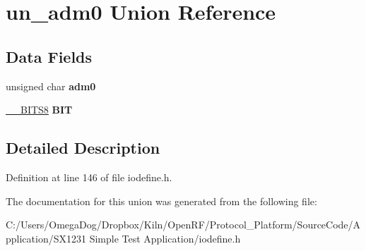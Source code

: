\hypertarget{unionun__adm0}{\section{un\-\_\-adm0 Union Reference}
\label{unionun__adm0}
}
\subsection*{Data Fields}
\begin{DoxyCompactItemize}
\item 
\hypertarget{unionun__adm0_a4a91609a4ad6e5a84f5adc33951a976d}{unsigned char {\bfseries adm0}}\label{unionun__adm0_a4a91609a4ad6e5a84f5adc33951a976d}

\item 
\hypertarget{unionun__adm0_ac4ab04373a7c58336cc2acdc962f6042}{\hyperlink{struct_____b_i_t_s8}{\-\_\-\-\_\-\-B\-I\-T\-S8} {\bfseries B\-I\-T}}\label{unionun__adm0_ac4ab04373a7c58336cc2acdc962f6042}

\end{DoxyCompactItemize}


\subsection{Detailed Description}


Definition at line 146 of file iodefine.\-h.



The documentation for this union was generated from the following file\-:\begin{DoxyCompactItemize}
\item 
C\-:/\-Users/\-Omega\-Dog/\-Dropbox/\-Kiln/\-Open\-R\-F/\-Protocol\-\_\-\-Platform/\-Source\-Code/\-Application/\-S\-X1231 Simple Test Application/iodefine.\-h\end{DoxyCompactItemize}
